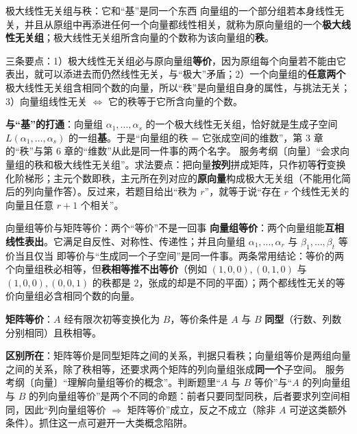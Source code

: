 \begin{fdeep}{极大线性无关组与秩：它和“基”是同一个东西}
向量组的一个部分组若本身线性无关，并且从原组中再添进任何一个向量都线性相关，就称为原向量组的一个\textbf{极大线性无关组}；极大线性无关组所含向量的个数称为该向量组的\textbf{秩}。

三条要点：1）极大线性无关组必与原向量组\textbf{等价}，因为原组每个向量若不能由它表出，就可以添进去而仍然线性无关，与“极大”矛盾；2）一个向量组的\textbf{任意两个}极大线性无关组含相同个数的向量，所以“秩”是向量组自身的属性，与挑法无关；3）向量组线性无关 $\iff$ 它的秩等于它所含向量的个数。

\textbf{与“基”的打通}：向量组 $\alpha_1,\dots,\alpha_s$ 的一个极大线性无关组，恰好就是生成子空间 $L(\alpha_1,\dots,\alpha_s)$ 的一组\textbf{基}。于是“向量组的秩 = 它张成空间的维数”，第 3 章的“秩”与第 6 章的“维数”从此是同一件事的两个名字。
\fbref{}服务考纲〔向量〕“会求向量组的秩和极大线性无关组”。求法要点：把向量\textbf{按列}拼成矩阵，只作初等\textbf{行}变换化阶梯形；主元个数即秩，主元所在列对应的\textbf{原向量}构成极大无关组（不能用化简后的列向量作答）。反过来，若题目给出“秩为 $r$”，就等于说“存在 $r$ 个线性无关的向量且任意 $r+1$ 个相关”。
\end{fdeep}

\begin{fdeep}{向量组等价与矩阵等价：两个“等价”不是一回事}
\textbf{向量组等价}：两个向量组能\textbf{互相线性表出}。它满足自反性、对称性、传递性；并且向量组 $\alpha_1,\dots,\alpha_r$ 与 $\beta_1,\dots,\beta_t$ 等价当且仅当
即等价与“生成同一个子空间”是同一件事。两条常用结论：等价的两个向量组秩必相等，但\textbf{秩相等推不出等价}（例如 $(1,0,0),(0,1,0)$ 与 $(1,0,0),(0,0,1)$ 的秩都是 $2$，张成的却是不同的平面）；两个都线性无关的等价向量组必含相同个数的向量。

\textbf{矩阵等价}：$A$ 经有限次初等变换化为 $B$，等价条件是 $A$ 与 $B$ \textbf{同型}（行数、列数分别相同）且秩相等。

\textbf{区别所在}：矩阵等价是同型矩阵之间的关系，判据只看秩；向量组等价是两组向量之间的关系，除了秩相等，还要求两个矩阵的列向量组张成\textbf{同一个}子空间。
\fbref{}服务考纲〔向量〕“理解向量组等价的概念”。判断题里“$A$ 与 $B$ 等价”与“$A$ 的列向量组与 $B$ 的列向量组等价”是两个不同的命题：前者只要同型同秩，后者要求列空间相同，因此“列向量组等价 $\Longrightarrow$ 矩阵等价”成立，反之不成立（除非 $A$ 可逆这类额外条件）。抓住这一点可避开一大类概念陷阱。
\end{fdeep}


